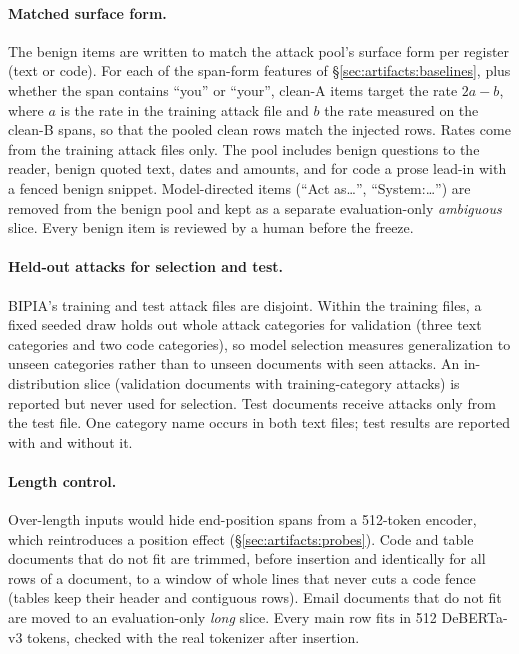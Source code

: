 \paragraph{Matched surface form.}
The benign items are written to match the attack pool's surface form per register (text or code). For each of the
span-form features of \S\ref{sec:artifacts:baselines}, plus whether the span contains ``you'' or ``your'', clean-A
items target the rate $2a - b$, where $a$ is the rate in the training attack file and $b$ the rate measured on the
clean-B spans, so that the pooled clean rows match the injected rows. Rates come from the training attack files
only. The pool includes benign questions to the reader, benign quoted text, dates and amounts, and for code a prose
lead-in with a fenced benign snippet. Model-directed items (``Act as\ldots'', ``System:\ldots'') are removed from the
benign pool and kept as a separate evaluation-only \emph{ambiguous} slice. Every benign item is reviewed by a human
before the freeze. 

\paragraph{Held-out attacks for selection and test.}
BIPIA's training and test attack files are disjoint. Within the training files, a fixed seeded draw holds out whole
attack categories for validation (three text categories and two code categories), so model selection measures
generalization to unseen categories rather than to unseen documents with seen attacks. An in-distribution slice
(validation documents with training-category attacks) is reported but never used for selection. Test documents
receive attacks only from the test file. One category name occurs in both text files; test results are reported
with and without it.

\paragraph{Length control.}
Over-length inputs would hide end-position spans from a 512-token encoder, which reintroduces a position effect
(\S\ref{sec:artifacts:probes}). Code and table documents that do not fit are trimmed, before insertion and
identically for all rows of a document, to a window of whole lines that never cuts a code fence (tables keep their
header and contiguous rows). Email documents that do not fit are moved to an evaluation-only \emph{long} slice.
Every main row fits in 512 DeBERTa-v3 tokens, checked with the real tokenizer after insertion.


